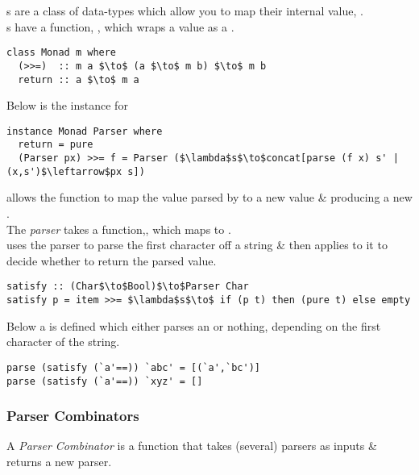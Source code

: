 \documentclass[11pt,a4paper]{article}
\begin{document}
{}s are a class of data-types which allow you to map their internal value, {\ttfamily{>>=}}.\\
{}s have a function, {}, which wraps a value as a {}.
\begin{lstlisting}
class Monad m where
  (>>=)  :: m a $\to$ (a $\to$ m b) $\to$ m b
  return :: a $\to$ m a
\end{lstlisting}

Below is the {} instance for {}
\begin{lstlisting}
instance Monad Parser where
  return = pure
  (Parser px) >>= f = Parser ($\lambda$s$\to$concat[parse (f x) s' | (x,s')$\leftarrow$px s])
\end{lstlisting}
{\ttfamily{>>=}} allows the function {} to map the value {} parsed by {} to a new value \& producing a new {}.\\

The {} \textit{parser} takes a function,{}, which maps {} to {}.\\
{} uses the {} parser to parse the first character off a string \& then applies {} to it to decide whether to return the parsed value.
\begin{lstlisting}
satisfy :: (Char$\to$Bool)$\to$Parser Char
satisfy p = item >>= $\lambda$s$\to$ if (p t) then (pure t) else empty
\end{lstlisting}

Below a {} is defined which either parses an {} or nothing, depending on the first character of the string.
\begin{lstlisting}
parse (satisfy (`a'==)) `abc' = [(`a',`bc')]
parse (satisfy (`a'==)) `xyz' = []
\end{lstlisting}

\subsubsection{Parser Combinators}

A \textit{Parser Combinator} is a function that takes (several) parsers as inputs \& returns a new parser.\\
\end{document}
